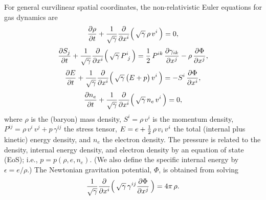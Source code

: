 \documentclass[10pt,preprint]{aastex}
\begin{document}
For general curvilinear spatial coordinates, the non-relativistic Euler equations for gas dynamics are %
\begin{equation}
  \frac{\partial \rho}{\partial t}
  +\frac{1}{\sqrt{\gamma}}\frac{\partial }{\partial x^{i}}\Big(\,\sqrt{\gamma}\,\rho\,v^{i}\,\Big)=0,
  \label{eq:massConservation}
\end{equation}
\begin{equation}
  \frac{\partial S_{j}}{\partial t}
  +\frac{1}{\sqrt{\gamma}}\frac{\partial }{\partial x^{i}}\Big(\,\sqrt{\gamma}\,P^{i}_{~j}\,\Big)
  =\frac{1}{2}\,P^{ik}\,\frac{\partial \gamma_{ik}}{\partial x^{j}}-\rho\,\frac{\partial \Phi}{\partial x^{j}},
  \label{eq:momentumConservation}
\end{equation}
\begin{equation}
  \frac{\partial E}{\partial t}
  +\frac{1}{\sqrt{\gamma}}\frac{\partial }{\partial x^{i}}\Big(\,\sqrt{\gamma}\,\big(E+p\big)\,v^{i}\,\Big)
  =-S^{i}\,\frac{\partial \Phi}{\partial x^{i}},
  \label{eq:energyConservation}
\end{equation}
\begin{equation}
  \frac{\partial n_{e}}{\partial t}
  +\frac{1}{\sqrt{\gamma}}\frac{\partial }{\partial x^{i}}\Big(\,\sqrt{\gamma}\,n_{e}\,v^{i}\,\Big)=0,
  \label{eq:electronConservation}
\end{equation}
where $\rho$ is the (baryon) mass density, $S^{i}=\rho\,v^{i}$ is the momentum density, $P^{ij}=\rho\,v^{i}\,v^{j}+p\,\gamma^{ij}$ the stress tensor, $E=e+\frac{1}{2}\,\rho\,v_{i}\,v^{i}$ the total (internal plus kinetic) energy density, and $n_{e}$ the electron density.  
The pressure is related to the density, internal energy density, and electron density by an equation of state (EoS); i.e., $p=p(\rho,e,n_{e})$.  
(We also define the specific internal energy by $\epsilon=e/\rho$.)
The Newtonian gravitation potential, $\Phi$, is obtained from solving
\begin{equation}
  \frac{1}{\sqrt{\gamma}}\frac{\partial }{\partial x^{i}}\Big(\,\sqrt{\gamma}\,\gamma^{ij}\frac{\partial \Phi}{\partial x^{j}}\,\Big)=4\pi\,\rho.  
  \label{eq:poisson}
\end{equation}
\end{document}
